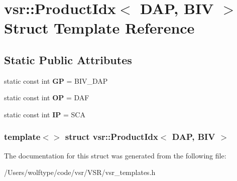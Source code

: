 \hypertarget{structvsr_1_1_product_idx_3_01_d_a_p_00_01_b_i_v_01_4}{\section{vsr\-:\-:Product\-Idx$<$ D\-A\-P, B\-I\-V $>$ Struct Template Reference}
\label{structvsr_1_1_product_idx_3_01_d_a_p_00_01_b_i_v_01_4}
}
\subsection*{Static Public Attributes}
\begin{DoxyCompactItemize}
\item 
\hypertarget{structvsr_1_1_product_idx_3_01_d_a_p_00_01_b_i_v_01_4_ad1762273ea4c50a3e4901dc23ce02ee7}{static const int {\bfseries G\-P} = B\-I\-V\-\_\-\-D\-A\-P}\label{structvsr_1_1_product_idx_3_01_d_a_p_00_01_b_i_v_01_4_ad1762273ea4c50a3e4901dc23ce02ee7}

\item 
\hypertarget{structvsr_1_1_product_idx_3_01_d_a_p_00_01_b_i_v_01_4_a65b56881dd652714a9c444926f294830}{static const int {\bfseries O\-P} = D\-A\-F}\label{structvsr_1_1_product_idx_3_01_d_a_p_00_01_b_i_v_01_4_a65b56881dd652714a9c444926f294830}

\item 
\hypertarget{structvsr_1_1_product_idx_3_01_d_a_p_00_01_b_i_v_01_4_ac97ac75f52354de1bcb565222646acce}{static const int {\bfseries I\-P} = S\-C\-A}\label{structvsr_1_1_product_idx_3_01_d_a_p_00_01_b_i_v_01_4_ac97ac75f52354de1bcb565222646acce}

\end{DoxyCompactItemize}
\subsubsection*{template$<$$>$ struct vsr\-::\-Product\-Idx$<$ D\-A\-P, B\-I\-V $>$}



The documentation for this struct was generated from the following file\-:\begin{DoxyCompactItemize}
\item 
/\-Users/wolftype/code/vsr/\-V\-S\-R/vsr\-\_\-templates.\-h\end{DoxyCompactItemize}
